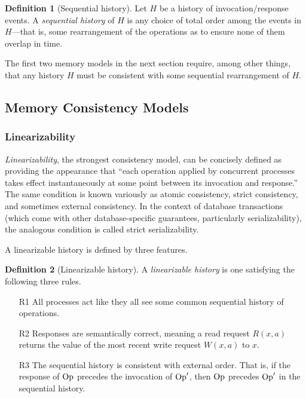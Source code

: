 \documentclass[]             %
{NASA}                       %
\theoremstyle{definition}
\newtheorem{definition}{Definition}[section]
\providecommand{\tightlist}{%
  \setlength{\itemsep}{0pt}\setlength{\parskip}{0pt}}
\begin{document}
\begin{definition}[Sequential history]
  Let $H$ be a history of invocation/response events. A
  \emph{sequential history} of $H$ is any choice of total order among
  the events in $H$---that is, some rearrangement of the operations as
  to ensure none of them overlap in time.
\end{definition}

The first two memory models in the next section require, among other
things, that any history $H$ must be consistent with some sequential
rearrangement of $H$.

\subsection{Memory Consistency Models}

\subsubsection{Linearizability}
\label{sssec:linearizability}

\emph{Linearizability}, the strongest consistency model, can be
concisely defined as providing the appearance that ``each operation
applied by concurrent processes takes effect instantaneously at some
point between its invocation and response.''
\cite{10.1145/78969.78972} The same condition is known variously as
atomic consistency, strict consistency, and sometimes external
consistency. In the context of database transactions (which come with
other database-specific guarantees, particularly serializability), the
analogous condition is called strict serializability.

A linearizable history is defined by three features.
\begin{definition}[Linearizable history]
  \label{def:linearizable}
  A \emph{linearizable history} is one satisfying the following three rules.
\begin{enumerate}
  \tightlist
\item[R1] All processes act like they all see some common sequential
  history of operations.
\item[R2] Responses are semantically correct, meaning a read request
  \(R(x, a)\) returns the value of the most recent write request
  \(W(x, a)\) to \(x\).
\item[R3] The sequential history is consistent with external
  order. That is, if the response of $\mathrm{Op}$ precedes the invocation of
  $\mathrm{Op}'$, then $\mathrm{Op}$ precedes $\mathrm{Op}'$ in the sequential history.
\end{enumerate}
\end{definition}
\end{document}
